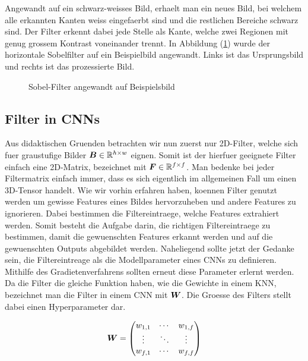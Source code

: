 Angewandt auf ein schwarz-weisses Bild, erhaelt man ein neues Bild, bei welchem alle erkannten
Kanten weiss eingefaerbt sind und die restlichen Bereiche schwarz sind.
Der Filter erkennt dabei jede Stelle als Kante, welche zwei Regionen mit
genug grossem Kontrast voneinander trennt.
In Abbildung (\ref{fig:sobel_filter}) wurde der horizontale Sobelfilter auf ein
Beispielbild angewandt. Links ist das Ursprungsbild und rechts ist das
prozessierte Bild.


\begin{figure}[h!]

  \caption{Sobel-Filter angewandt auf Beispielsbild}
  \label{fig:sobel_filter}
\end{figure}

\para{}
\cite{wiki:sobel_operator}
\cite{deeplearning.ai:cnn}
\cite{wiki:kernel}


\subsection{Filter in CNNs}
Aus didaktischen Gruenden betrachten wir nun zuerst
nur 2D-Filter, welche sich fuer graustufige Bilder
$\bm{B} \in \mathbb{R}^{h \times w}$ eignen. Somit ist der hierfuer geeignete
Filter einfach eine 2D-Matrix, bezeichnet mit $\bm{F} \in \mathbb{R}^{f \times
  f}$. Man bedenke bei jeder Filtermatrix einfach immer, dass es sich
eigentlich im allgemeinen Fall um einen 3D-Tensor handelt.
\para{}
Wie wir vorhin erfahren haben, koennen Filter genutzt werden um gewisse
Features eines Bildes hervorzuheben und andere Features zu ignorieren. Dabei
bestimmen die Filtereintraege, welche Features extrahiert werden. Somit besteht
die Aufgabe darin, die richtigen Filtereintraege zu bestimmen, damit die
gewuenschten Features erkannt werden und auf die gewuenschten Outputs abgebildet
werden. Naheliegend sollte jetzt der Gedanke sein, die Filtereintreage als die
Modellparameter eines CNNs zu definieren.
Mithilfe des Gradietenverfahrens sollten erneut diese Parameter
erlernt werden. \\
Da die Filter die gleiche Funktion haben, wie die Gewichte in einem KNN,
bezeichnet man die Filter in einem CNN mit $\bm{W}$. Die Groesse des Filters
stellt dabei einen Hyperparameter dar.

\begin{equation*}
  \bm{W} = \begin{pmatrix}
    w_{1,1} & \cdots & w_{1,f} \\
    \vdots & \ddots & \vdots \\
    w_{f,1} & \cdots & w_{f,f}
  \end{pmatrix}
\end{equation*}


